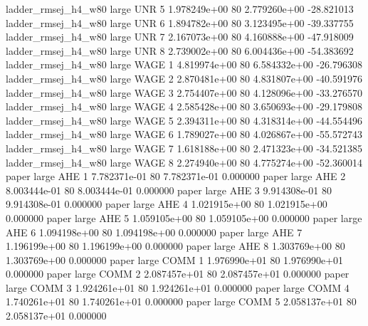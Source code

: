 ladder_rmsej_h4_w80      large      UNR                 5 1.978249e+00 80   2.779260e+00         -28.821013
ladder_rmsej_h4_w80      large      UNR                 6 1.894782e+00 80   3.123495e+00         -39.337755
ladder_rmsej_h4_w80      large      UNR                 7 2.167073e+00 80   4.160888e+00         -47.918009
ladder_rmsej_h4_w80      large      UNR                 8 2.739002e+00 80   6.004436e+00         -54.383692
ladder_rmsej_h4_w80      large     WAGE                 1 4.819974e+00 80   6.584332e+00         -26.796308
ladder_rmsej_h4_w80      large     WAGE                 2 2.870481e+00 80   4.831807e+00         -40.591976
ladder_rmsej_h4_w80      large     WAGE                 3 2.754407e+00 80   4.128096e+00         -33.276570
ladder_rmsej_h4_w80      large     WAGE                 4 2.585428e+00 80   3.650693e+00         -29.179808
ladder_rmsej_h4_w80      large     WAGE                 5 2.394311e+00 80   4.318314e+00         -44.554496
ladder_rmsej_h4_w80      large     WAGE                 6 1.789027e+00 80   4.026867e+00         -55.572743
ladder_rmsej_h4_w80      large     WAGE                 7 1.618188e+00 80   2.471323e+00         -34.521385
ladder_rmsej_h4_w80      large     WAGE                 8 2.274940e+00 80   4.775274e+00         -52.360014
              paper      large      AHE                 1 7.782371e-01 80   7.782371e-01           0.000000
              paper      large      AHE                 2 8.003444e-01 80   8.003444e-01           0.000000
              paper      large      AHE                 3 9.914308e-01 80   9.914308e-01           0.000000
              paper      large      AHE                 4 1.021915e+00 80   1.021915e+00           0.000000
              paper      large      AHE                 5 1.059105e+00 80   1.059105e+00           0.000000
              paper      large      AHE                 6 1.094198e+00 80   1.094198e+00           0.000000
              paper      large      AHE                 7 1.196199e+00 80   1.196199e+00           0.000000
              paper      large      AHE                 8 1.303769e+00 80   1.303769e+00           0.000000
              paper      large     COMM                 1 1.976990e+01 80   1.976990e+01           0.000000
              paper      large     COMM                 2 2.087457e+01 80   2.087457e+01           0.000000
              paper      large     COMM                 3 1.924261e+01 80   1.924261e+01           0.000000
              paper      large     COMM                 4 1.740261e+01 80   1.740261e+01           0.000000
              paper      large     COMM                 5 2.058137e+01 80   2.058137e+01           0.000000
